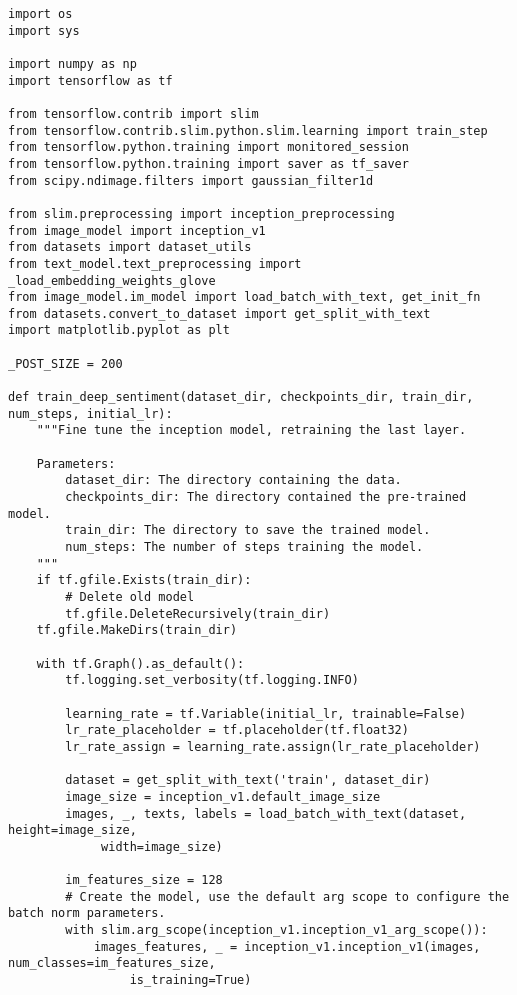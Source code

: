 \begin{lstlisting}
import os
import sys

import numpy as np
import tensorflow as tf

from tensorflow.contrib import slim
from tensorflow.contrib.slim.python.slim.learning import train_step
from tensorflow.python.training import monitored_session
from tensorflow.python.training import saver as tf_saver
from scipy.ndimage.filters import gaussian_filter1d

from slim.preprocessing import inception_preprocessing
from image_model import inception_v1
from datasets import dataset_utils
from text_model.text_preprocessing import _load_embedding_weights_glove
from image_model.im_model import load_batch_with_text, get_init_fn
from datasets.convert_to_dataset import get_split_with_text
import matplotlib.pyplot as plt

_POST_SIZE = 200

def train_deep_sentiment(dataset_dir, checkpoints_dir, train_dir, num_steps, initial_lr):
    """Fine tune the inception model, retraining the last layer.

    Parameters:
        dataset_dir: The directory containing the data.
        checkpoints_dir: The directory contained the pre-trained model.
        train_dir: The directory to save the trained model.
        num_steps: The number of steps training the model.
    """
    if tf.gfile.Exists(train_dir):
        # Delete old model
        tf.gfile.DeleteRecursively(train_dir)
    tf.gfile.MakeDirs(train_dir)

    with tf.Graph().as_default():
        tf.logging.set_verbosity(tf.logging.INFO)

        learning_rate = tf.Variable(initial_lr, trainable=False)
        lr_rate_placeholder = tf.placeholder(tf.float32)
        lr_rate_assign = learning_rate.assign(lr_rate_placeholder)

        dataset = get_split_with_text('train', dataset_dir)
        image_size = inception_v1.default_image_size
        images, _, texts, labels = load_batch_with_text(dataset, height=image_size, 
             width=image_size)
        
        im_features_size = 128
        # Create the model, use the default arg scope to configure the batch norm parameters.
        with slim.arg_scope(inception_v1.inception_v1_arg_scope()):
            images_features, _ = inception_v1.inception_v1(images, num_classes=im_features_size, 
                 is_training=True)


\end{lstlisting}

